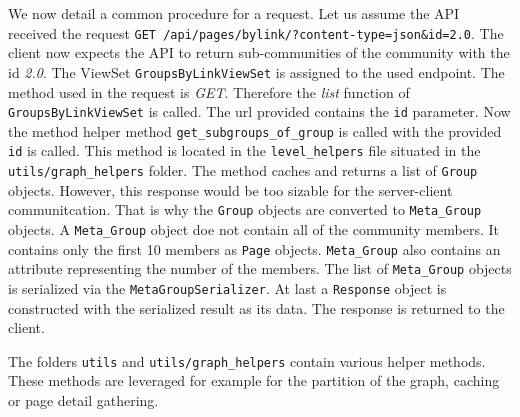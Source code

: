 We now detail a common procedure for a request. Let us assume the API received the request 
\texttt{GET /api/pages/bylink/?content-type=json\&id=2.0}. The client now expects the API to return sub-communities of the community with the id \textit{2.0}. The ViewSet \texttt{GroupsByLinkViewSet} is assigned to the used endpoint. The method used in the request is \textit{GET}. Therefore the \textit{list} function of \texttt{GroupsByLinkViewSet} is called. The url provided contains the \texttt{id} parameter. Now the method helper method \texttt{get\_subgroups\_of\_group} is called with the provided \texttt{id} is called. This method is located in the \texttt{level\_helpers} file situated in the \texttt{utils/graph\_helpers} folder. The method caches and returns a list of \texttt{Group} objects. However, this response would be too sizable for the server-client communitcation. That is why the \texttt{Group} objects are converted to \texttt{Meta\_Group} objects. A \texttt{Meta\_Group} object doe not contain all of the community members. It contains only the first 10 members as \texttt{Page} objects. \texttt{Meta\_Group} also contains an attribute representing the number of the members. The list of \texttt{Meta\_Group} objects is serialized via the \texttt{MetaGroupSerializer}. At last a \texttt{Response} object is constructed with the serialized result as its data. The response is returned to the client.

The folders \texttt{utils} and \texttt{utils/graph\_helpers} contain various helper methods. These methods are leveraged for example for the partition of the graph, caching or page detail gathering.


